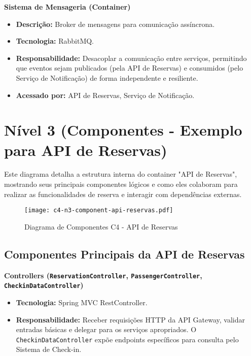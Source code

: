 \textbf{Sistema de Mensageria (Container)}
\begin{itemize}
    \item \textbf{Descrição:} Broker de mensagens para comunicação assíncrona.
    \item \textbf{Tecnologia:} RabbitMQ.
    \item \textbf{Responsabilidade:} Desacoplar a comunicação entre serviços, permitindo que eventos sejam publicados (pela API de Reservas) e consumidos (pelo Serviço de Notificação) de forma independente e resiliente.
    \item \textbf{Acessado por:} API de Reservas, Serviço de Notificação.
\end{itemize}

\section{Nível 3 (Componentes - Exemplo para API de Reservas)}
\label{sec:c4-componentes}

Este diagrama detalha a estrutura interna do container "API de Reservas", mostrando seus principais componentes lógicos e como eles colaboram para realizar as funcionalidades de reserva e interagir com dependências externas.

\begin{figure}[htbp]
    \centering
    \texttt{[image: c4-n3-component-api-reservas.pdf]}
    \caption{Diagrama de Componentes C4 - API de Reservas}
    \label{fig:c4-componentes-api-reservas}
\end{figure}

\subsection{Componentes Principais da API de Reservas}
\label{subsec:c4-componentes-api-reservas-principais}

\textbf{Controllers (\texttt{ReservationController}, \texttt{PassengerController}, \texttt{CheckinDataController})}
\begin{itemize}
    \item \textbf{Tecnologia:} Spring MVC RestController.
    \item \textbf{Responsabilidade:} Receber requisições HTTP da API Gateway, validar entradas básicas e delegar para os serviços apropriados. O \texttt{CheckinDataController} expõe endpoints específicos para consulta pelo Sistema de Check-in.
\end{itemize}

